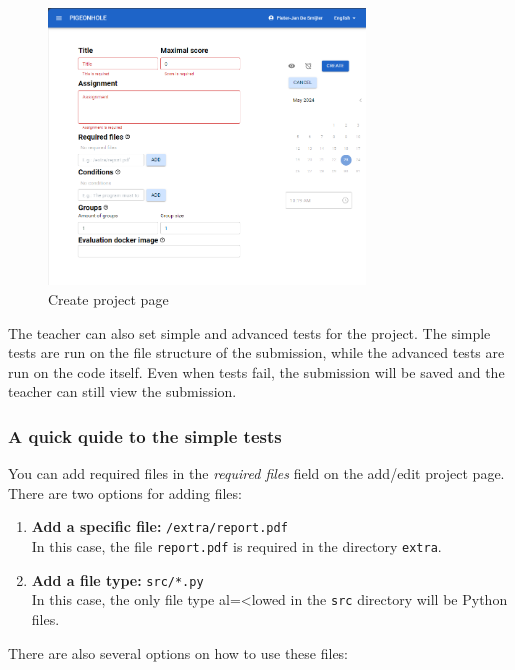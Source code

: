 \documentclass{article}
\begin{document}
\begin{figure}[H]
    \centering
    \includegraphics[width=0.75\textwidth]{images/createproject.png}
    \caption{Create project page}
\end{figure}

The teacher can also set simple and advanced tests for the project. The simple tests are run on the file structure of the submission, while the advanced tests are run on the code itself. Even when tests fail, the submission will be saved and the teacher can still view the submission.

\subsubsection{A quick quide to the simple tests}

You can add required files in the \textit{required files} field on the add/edit project page.
There are two options for adding files:

\begin{enumerate}[label=\arabic*.]
    \item \textbf{Add a specific file:} \texttt{/extra/report.pdf}\\
    In this case, the file \texttt{report.pdf} is required in the directory \texttt{extra}.
    
    \item \textbf{Add a file type:} \texttt{src/*.py}\\
    In this case, the only file type al=<lowed in the \texttt{src} directory will be Python files.
\end{enumerate}

There are also several options on how to use these files:
\end{document}
